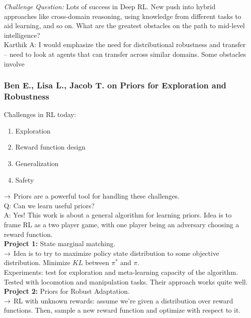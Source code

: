 {\it Challenge Question:} Lots of success in Deep RL. New push into hybrid approaches like cross-domain reasoning, using knowledge from different tasks to aid learning, and so on. What are the greatest obstacles on the path to mid-level intelligence? \\

Karthik A: I would emphasize the need for distributional robustness and transfer -- need to look at agents that can transfer across similar domains. Some obstacles involve 


\subsubsection{Ben E., Lisa L., Jacob T. on Priors for Exploration and Robustness}

Challenges in RL today:
\begin{enumerate}
    \item Exploration
    \item Reward function design
    \item Generalization
    \item Safety
\end{enumerate}

$\rightarrow$ Priors are a powerful tool for handling these challenges. \\

Q: Can we learn useful priors? \\

A: Yes! This work is about a general algorithm for learning priors. Idea is to frame RL as a two player game, with one player being an adversary choosing a reward function. \\

{\bf Project 1:} State marginal matching.\\
$\rightarrow$ Idea is to try to maximize policy state distribution to some objective distribution. Minimize $KL$ between $\pi^*$ and $\pi$. \\

Experiments: test for exploration and meta-learning capacity of the algorithm. Tested with locomotion and manipulation tasks. Their approach works quite well. \\

{\bf Project 2:} Priors for Robust Adaptation. \\

$\rightarrow$ RL with unknown rewards: assume we're given a distribution over reward functions. Then, sample a new reward function and optimize with respect to it. \\

